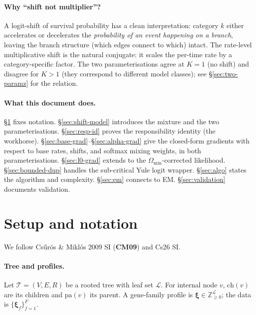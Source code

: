 \documentclass[11pt]{article}
\newcommand{\Z}{\mathbb{Z}}
\newcommand{\Tree}{\mathcal{T}}
\newcommand{\Leaves}{\mathcal{L}}
\newcommand{\pa}{\mathrm{pa}}
\newcommand{\ch}{\mathrm{ch}}
\newcommand{\troot}{R}
\newcommand{\Prof}{\boldsymbol{\xi}}
\newcommand{\Om}{\Omega}
\theoremstyle{definition}
\begin{document}
\paragraph{Why ``shift not multiplier''?}
A logit-shift of survival probability has a clean interpretation:
category $k$ either accelerates or decelerates the
\emph{probability of an event happening on a branch}, leaving the
branch structure (which edges connect to which) intact. The
rate-level multiplicative shift is the natural conjugate: it scales
the per-time rate by a category-specific factor. The two
parameterisations agree at $K=1$ (no shift) and disagree for $K>1$
(they correspond to different model classes); see
\S\ref{sec:two-paramz} for the relation.

\paragraph{What this document does.}
\S\ref{sec:notation} fixes notation. \S\ref{sec:shift-model}
introduces the mixture and the two parameterisations.
\S\ref{sec:resp-id} proves the responsibility identity (the workhorse).
\S\ref{sec:base-grad}--\S\ref{sec:alpha-grad} give the closed-form
gradients with respect to base rates, shifts, and softmax mixing
weights, in both parameterisations. \S\ref{sec:l0-grad} extends to
the $\Om_{\min}$-corrected likelihood. \S\ref{sec:bounded-dup}
handles the sub-critical Yule logit wrapper. \S\ref{sec:algo}
states the algorithm and complexity. \S\ref{sec:em} connects to EM.
\S\ref{sec:validation} documents validation.

\section{Setup and notation}
\label{sec:notation}

We follow Cs\H{u}r\"os \& Mikl\'os 2009 SI (\textbf{CM09}) and Cs26
SI.

\paragraph{Tree and profiles.}
Let $\Tree = (V, E, \troot)$ be a rooted tree with leaf set
$\Leaves$. For internal node $v$, $\ch(v)$ are its children and
$\pa(v)$ its parent. A gene-family profile is
$\Prof \in \Z_{\ge 0}^\Leaves$; the data is $\{\Prof_f\}_{f=1}^F$.
\end{document}
